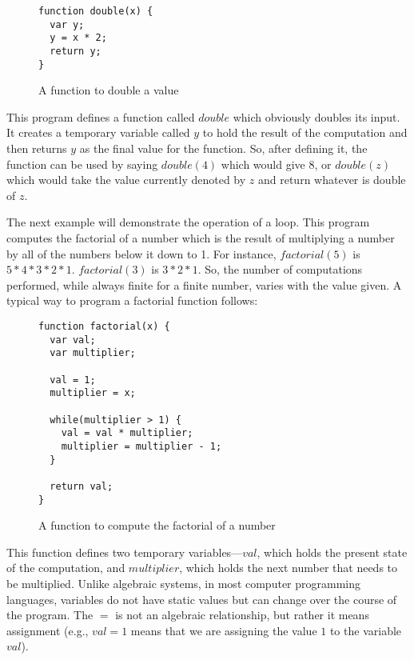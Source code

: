 \begin{figure}[H]
\begin{mdframed}
\begin{verbatim}
function double(x) {
  var y;
  y = x * 2;
  return y;
}
\end{verbatim}
\end{mdframed}
\caption{A function to double a value}
\end{figure}

This program defines a function called $double$ which obviously doubles its input.  It creates a temporary variable called $y$ to hold the result of the computation and then returns $y$ as the final value for the function.  So, after defining it, the function can be used by saying $double(4)$ which would give $8$, or $double(z)$ which would take the value currently denoted by $z$ and return whatever is double of $z$.

The next example will demonstrate the operation of a loop.  This program computes the factorial of a number which is the result of multiplying a number by all of the numbers below it down to 1.  For instance, $factorial(5)$ is $5 * 4 * 3 * 2 * 1$.  $factorial(3)$ is $3 * 2 * 1$.  So, the number of computations performed, while always finite for a finite number, varies with the value given.  A typical way to program a factorial function follows:

\begin{figure}[H]
\begin{mdframed}
\begin{verbatim}
function factorial(x) {
  var val;
  var multiplier;

  val = 1;
  multiplier = x;

  while(multiplier > 1) {
    val = val * multiplier;
    multiplier = multiplier - 1;
  }

  return val;
}
\end{verbatim}
\end{mdframed}
\caption{A function to compute the factorial of a number}
\end{figure}

This function defines two temporary variables---$val$, which holds the present state of the computation, and $multiplier$, which holds the next number that needs to be multiplied.  Unlike algebraic systems, in most computer programming languages, variables do not have static values but can change over the course of the program.  The $=$ is not an algebraic relationship, but rather it means assignment (e.g.,  $val = 1$ means that we are assigning the value $1$ to the variable $val$).  

